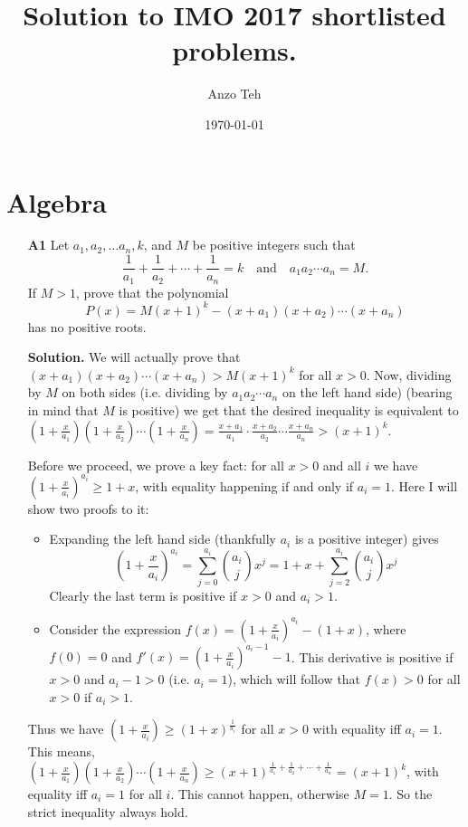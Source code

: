 \documentclass[11pt,a4paper]{article}
\begin{document}
\newcommand{\la}{\leftarrow}
\newcommand{\lra}{\leftrightarrow}


\title{Solution to IMO 2017 shortlisted problems.}
\author{Anzo Teh}
\date{\today}
\maketitle

\newpage
\section{Algebra}
\begin{enumerate}
	\item[\textbf{A1}]Let $a_1,a_2,\ldots a_n,k$, and $M$ be positive integers such that
	$$\frac{1}{a_1}+\frac{1}{a_2}+\cdots+\frac{1}{a_n}=k\quad\text{and}\quad a_1a_2\cdots a_n=M.$$If $M>1$, prove that the polynomial
	$$P(x)=M(x+1)^k-(x+a_1)(x+a_2)\cdots (x+a_n)$$has no positive roots.
	
	\textbf{Solution.} We will actually prove that $(x+a_1)(x+a_2)\cdots (x+a_n) > M(x+1)^k$ for all $x > 0$. 
	Now, dividing by $M$ on both sides (i.e. dividing by $a_1a_2\cdots a_n$ on the left hand side) (bearing in mind that $M$ is positive) we get that the desired inequality is equivalent to 
	$(1+\frac{x}{a_1})(1+\frac{x}{a_2})\cdots (1+\frac{x}{a_n}) = \frac{x+a_1}{a_1}\cdot\frac{x+a_2}{a_2}\cdots \frac{x+a_n}{a_n} > (x+1)^k$. 
	
	Before we proceed, we prove a key fact: for all $x > 0$ and all $i$ we have $(1+\frac{x}{a_i})^{a_i} \ge 1+x$, with equality happening if and only if $a_i = 1$. Here I will show two proofs to it: 
	\begin{itemize}
		\item Expanding the left hand side (thankfully $a_i$ is a positive integer) gives 
		\[(1+\frac{x}{a_i})^{a_i}=\sum_{j=0}^{a_i}\binom{a_i}{j}x^j=1+x+\sum_{j=2}^{a_i}\binom{a_i}{j}x^j\]
		Clearly the last term is positive if $x>0$ and $a_i>1$. 
		\item Consider the expression $f(x)=(1+\frac{x}{a_i})^{a_i} - (1+x)$, where $f(0)=0$ and $f'(x)=(1+\frac{x}{a_i})^{a_i-1}-1$. This derivative is positive if $x>0$ and $a_i-1>0$ (i.e. $a_i=1$), which will follow that $f(x)>0$ for all $x>0$ if $a_i>1$. 
	\end{itemize}
Thus we have $(1+\frac{x}{a_i}) \ge (1+x)^{\frac{1}{a_i}}$ for all $x>0$ with equality iff $a_i=1$. This means, 
$(1+\frac{x}{a_1})(1+\frac{x}{a_2})\cdots (1+\frac{x}{a_n}) \ge (x+1)^{\frac{1}{a_1}+\frac{1}{a_2}+\cdots + \frac{1}{a_n}}=(x+1)^k$, with equality iff $a_i=1$ for all $i$. This cannot happen, otherwise $M=1$. So the strict inequality always hold. 
\end{enumerate}
\end{document}
